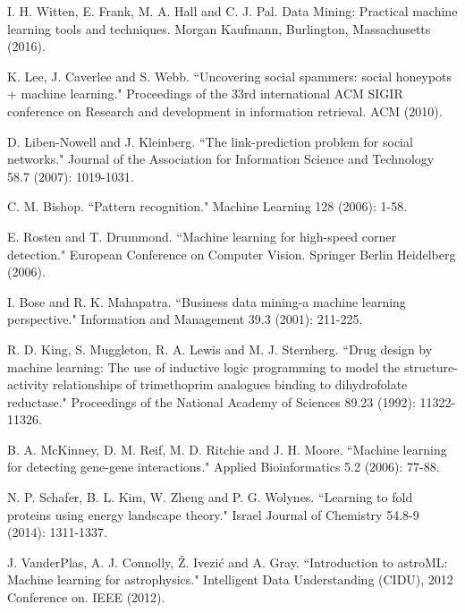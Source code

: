 \documentclass[pra,letterpaper,10pt,twocolumn]{revtex4}
\begin{document}
\begin{thebibliography}{100}


I. H. Witten, E. Frank,  M. A. Hall and C. J. Pal. Data Mining: Practical machine learning tools and techniques. Morgan Kaufmann, Burlington, Massachusetts (2016).

K. Lee, J. Caverlee and S. Webb. ``Uncovering social spammers: social honeypots + machine learning." Proceedings of the 33rd international ACM SIGIR conference on Research and development in information retrieval. ACM (2010).

D. Liben-Nowell and J. Kleinberg. ``The link-prediction problem for social networks." Journal of the Association for Information Science and Technology 58.7 (2007): 1019-1031.

C. M. Bishop. ``Pattern recognition." Machine Learning 128 (2006): 1-58.

E. Rosten and T. Drummond. ``Machine learning for high-speed corner detection." European Conference on Computer Vision. Springer Berlin Heidelberg (2006).

I. Bose and R. K. Mahapatra. ``Business data mining-a machine learning perspective." Information and Management 39.3 (2001): 211-225.

R. D. King, S. Muggleton, R. A. Lewis and M. J. Sternberg. ``Drug design by machine learning: The use of inductive logic programming to model the structure-activity relationships of trimethoprim analogues binding to dihydrofolate reductase." Proceedings of the National Academy of Sciences 89.23 (1992): 11322-11326.

B. A. McKinney, D. M. Reif, M. D. Ritchie and J. H. Moore. ``Machine learning for detecting gene-gene interactions." Applied Bioinformatics 5.2 (2006): 77-88.

N. P. Schafer, B. L. Kim, W. Zheng and P. G. Wolynes. ``Learning to fold proteins using energy landscape theory." Israel Journal of Chemistry 54.8-9 (2014): 1311-1337.

J. VanderPlas, A. J. Connolly, {\v{Z}}. Ivezi{\'c} and A. Gray. ``Introduction to astroML: Machine learning for astrophysics." Intelligent Data Understanding (CIDU), 2012 Conference on. IEEE (2012).


\end{thebibliography}
\end{document}
